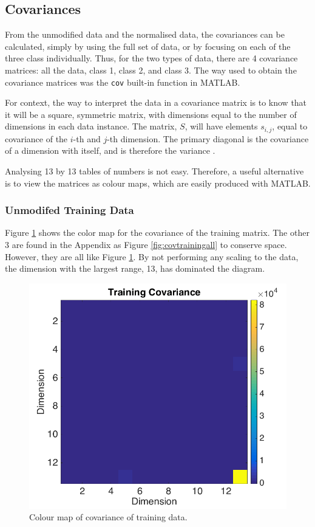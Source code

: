 \documentclass[a4paper, 10pt, conference]{ieeeconf}
\begin{document}
\subsection{Covariances}
From the unmodified data and the normalised data, the covariances can be calculated, simply by using the full set of data, or by focusing on each of the three class individually. Thus, for the two types of data, there are 4 covariance matrices: all the data, class 1, class 2, and class 3. The way used to obtain the covariance matrices was the \texttt{cov} built-in function in MATLAB.

For context, the way to interpret the data in a covariance matrix is to know that it will be a square, symmetric matrix, with dimensions equal to the number of dimensions in each data instance. The matrix, $S$, will have elements $s_{i, j}$, equal to covariance of the $i$-th and $j$-th dimension. The primary diagonal is the covariance of a dimension with itself, and is therefore the variance \cite{cov}.

Analysing 13 by 13 tables of numbers is not easy. Therefore, a useful alternative is to view the matrices as colour maps, which are easily produced with MATLAB. 

\subsubsection{Unmodifed Training Data}
Figure \ref{fig:covtrainingone} shows the color map for the covariance of the training matrix. The other 3 are found in the Appendix as Figure \ref{fig:covtrainingall} to conserve space. However, they are all like Figure \ref{fig:covtrainingone}. By not performing any scaling to the data, the dimension with the largest range, 13, has dominated the diagram.

\begin{figure}[!ht]
    \centering
    \includegraphics[width=\linewidth]{pic/covtraining.png}
    \caption{Colour map of covariance of training data.}
    \label{fig:covtrainingone}
\end{figure}
\end{document}
